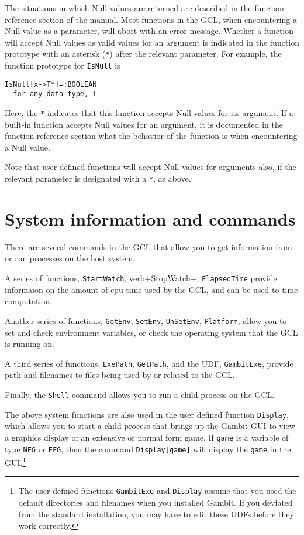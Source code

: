 The situations in which Null values are returned are described in the
function reference section of the manual.  Most functions in the GCL,
when encountering a Null value as a parameter, will abort with an
error message.  Whether a function will accept Null values as valid
values for an argument is indicated in the function prototype with an
asterisk (\verb+*+) after the relevant parameter.  For example, the
function prototype for \verb+IsNull+ is

\begin{verbatim}
IsNull[x->T*]=:BOOLEAN
  for any data type, T
\end{verbatim}

Here, the \verb+*+ indicates that this function accepts Null values
for its argument.  If a built-in function accepts Null values for an
argument, it is documented in the function reference section what the
behavior of the function is when encountering a Null value.  

Note that user defined functions  will accept Null values for
arguments also, if the relevant parameter is designated with a
\verb+*+, as above. 

\section{System information and commands}

There are several commands in the GCL that allow you to get
information from or run processes on the host system.  

A series of functions, \verb+StartWatch+, verb+StopWatch+,
\verb+ElapsedTime+ provide informaion on the amount of cpu time
used by the GCL, and can be used to time computation.  

Another series of functions, \verb+GetEnv+, \verb+SetEnv+,
\verb+UnSetEnv+, \verb+Platform+, allow you to set and check
environment variables, or check the operating system that the GCL is
running on.

A third series of functions, \verb+ExePath+, \verb+GetPath+, and the
UDF, \verb+GambitExe+, provide path and filenames to files being used
by or related to the GCL.

Finally, the \verb+Shell+ command allows you to run a child process on
the GCL.  

The above system functions are also used in the user defined function
\verb+Display+, which allows you to start a child process that brings
up the Gambit GUI to view a graphics display of an extensive or normal
form game. If \verb+game+ is a variable of type \verb+NFG+ or
\verb+EFG+, then the command \verb+Display[game]+ will display the
\verb+game+ in the GUI.\footnote{The user defined functions
\verb+GambitExe+ and \verb+Display+ assume that you used the default
directories and filenames when you installed Gambit.  If you deviated
from the standard installation, you may have to edit these UDFs
before they work correctly.}


